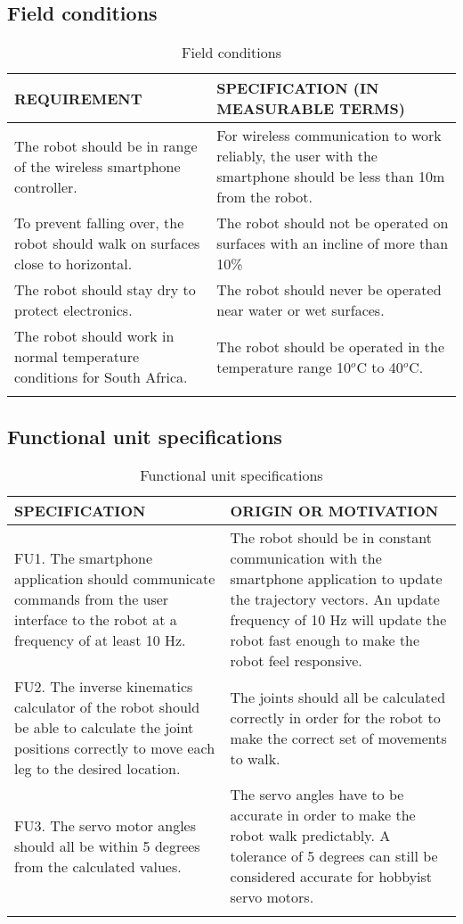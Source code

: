\vspace{1cm}
\subsection{Field conditions}

\begin{center}
\begin{longtable}{|p{7.5cm}|p{7.5cm}|}
\hline
  \textbf{REQUIREMENT} &
  \textbf{SPECIFICATION (IN MEASURABLE TERMS)} \\
\hline The robot should be in range of the wireless smartphone controller.
   & For wireless communication to work reliably, the user with the smartphone should be less than 10m from the robot.
   \\
\hline To prevent falling over, the robot should walk on surfaces close to horizontal.
   & The robot should not be operated on surfaces with an incline of more than 10\%
   \\
\hline The robot should stay dry to protect electronics.
   & The robot should never be operated near water or wet surfaces.
   \\
\hline The robot should work in normal temperature conditions for South Africa.
& The robot should be operated in the temperature range 10$^o$C to 40$^o$C.
\\
\hline
\caption{Field conditions}
\end{longtable}
\end{center}

\subsection{Functional unit specifications}

\begin{center}
\begin{longtable}{|p{7.5cm}|p{7.5cm}|}
\hline
  \textbf{SPECIFICATION} & \textbf{ORIGIN OR MOTIVATION} \\
\hline FU1. The smartphone application should communicate commands from the user interface to the robot at a frequency of at least 10 Hz.
   & The robot should be in constant communication with the smartphone application to update the trajectory vectors. An update frequency of 10 Hz will update the robot fast enough to make the robot feel responsive.
\\
\hline FU2. The inverse kinematics calculator of the robot should be able to calculate the joint positions correctly to move each leg to the desired location.
   & The joints should all be calculated correctly in order for the robot to make the correct set of movements to walk.
   \\
\hline FU3. The servo motor angles should all be within 5 degrees from the calculated values.
& The servo angles have to be accurate in order to make the robot walk predictably. A tolerance of 5 degrees can still be considered accurate for hobbyist servo motors.
\\
\hline
\caption{Functional unit specifications}
\end{longtable}
\end{center}

\newpage



